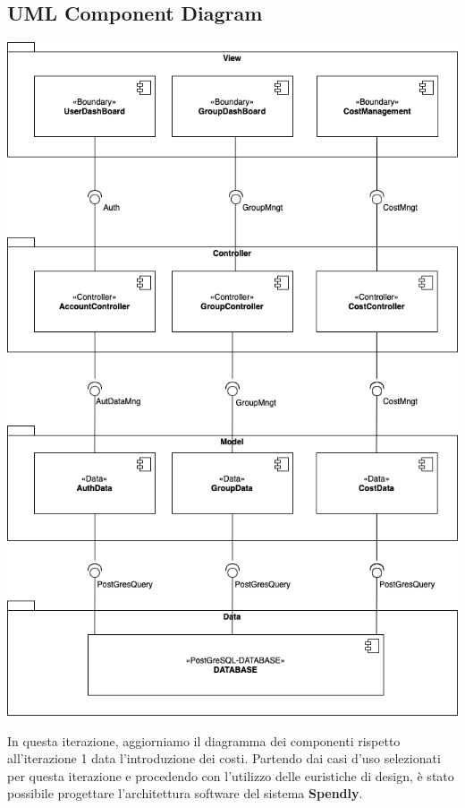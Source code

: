 \subsection{UML Component Diagram}

\begin{center}
    \includegraphics[scale=0.45]{images/ComponentDiagramV1.3.png}
\end{center}

In questa iterazione, aggiorniamo il diagramma dei componenti rispetto all'iterazione 1 data l'introduzione dei costi. 
Partendo dai casi d’uso selezionati per questa iterazione e procedendo con l’utilizzo delle euristiche di design, è stato possibile progettare l’architettura software del sistema \textbf{Spendly}.  

